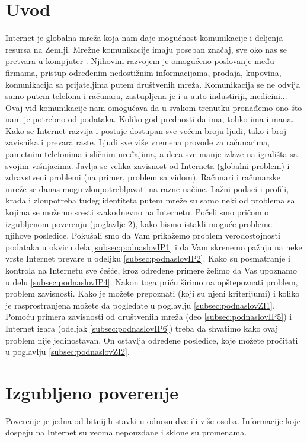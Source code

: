 \documentclass[a4paper]{article}
\begin{document}
\section{Uvod}
\label{sec:uvod}
 Internet je globalna mreža koja nam daje mogućnost komunikacije i deljenja resursa na Zemlji. Mrežne komunikacije imaju poseban značaj, sve oko nas se pretvara u kompjuter \cite{dataAndGoliath}. Njihovim razvojem je omogućeno poslovanje među firmama, pristup određenim nedostižnim informacijama, prodaja, kupovina, komunikacija sa prijateljima putem društvenih mreža. Komunikacija se ne odvija samo putem telefona i računara, zastupljena je i u auto industiriji, medicini... Ovaj vid komunikacije nam omogućava da u svakom trenutku pronađemo ono što nam je potrebno od podataka.\newline
 Koliko god prednosti da ima, toliko ima i mana. Kako se Internet razvija i postaje dostupan sve većem broju ljudi, tako i broj zavisnika i prevara raste. Ljudi sve više vremena provode za računarima, pametnim telefonima i sličnim uređajima, a deca sve manje izlaze na igrališta sa svojim vršnjacima. Javlja se velika zavisnost od Interneta (globalni problem) i zdravstveni problemi (na primer, problem sa vidom). Računari i računarske mreže se danas mogu zloupotrebljavati na razne načine. Lažni podaci i profili, krađa i zloupotreba tuđeg identiteta putem mreže su samo neki od problema sa kojima se možemo sresti svakodnevno na Internetu.\newline
 Počeli smo pričom o izgubljenom poverenju (poglavlje \ref{sec:izgubljeno_poverenje}), kako bismo istakli moguće probleme i njihove posledice. Pokušali smo da Vam prikažemo problem verodostojnosti podataka u okviru dela \ref{subsec:podnaslovIP1} i da Vam skrenemo pažnju na neke vrste Internet prevare u odeljku \ref{subsec:podnaslovIP2}. Kako su posmatranje i kontrola na Internetu sve češće, kroz određene primere želimo da Vas upoznamo u delu \ref{subsec:podnaslovIP4}. Nakon toga priču širimo na opštepoznati problem, problem zavisnosti. Kako je možete prepoznati (koji su njeni kriterijumi) i koliko je rasprostranjena možete da pogledate u poglavlju \ref{subsec:podnaslovZI1}. Pomoću primera zavisnosti od društveniih mreža (deo \ref{subsec:podnaslovIP5}) i Internet igara (odeljak \ref{subsec:podnaslovIP6}) treba da shvatimo kako ovaj problem nije jedinostavan. On ostavlja određene posledice, koje možete pročitati u poglavlju \ref{subsec:podnaslovZI2}.
\section{Izgubljeno poverenje}
\label{sec:izgubljeno_poverenje}
Poverenje je jedna od  bitnijih stavki u odnosu dve ili više osoba. Informacije koje dospeju na Internet su veoma nepouzdane i sklone su promenama.
\end{document}
